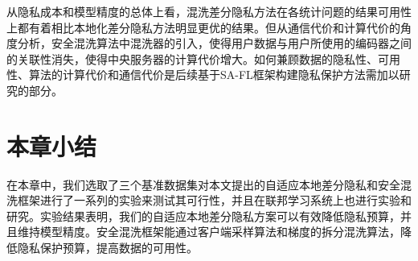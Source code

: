 从隐私成本和模型精度的总体上看，混洗差分隐私方法在各统计问题的结果可用性上都有着相比本地化差分隐私方法明显更优的结果。但从通信代价和计算代价的角度分析，安全混洗算法中混洗器的引入，使得用户数据与用户所使用的编码器之间的关联性消失，使得中央服务器的计算代价增大。如何兼顾数据的隐私性、可用性、算法的计算代价和通信代价是后续基于SA-FL框架构建隐私保护方法需加以研究的部分。


\section{本章小结}
在本章中，我们选取了三个基准数据集对本文提出的自适应本地差分隐私和安全混洗框架进行了一系列的实验来测试其可行性，并且在联邦学习系统上也进行实验和研究。实验结果表明，我们的自适应本地差分隐私方案可以有效降低隐私预算，并且维持模型精度。安全混洗框架能通过客户端采样算法和梯度的拆分混洗算法，降低隐私保护预算，提高数据的可用性。

